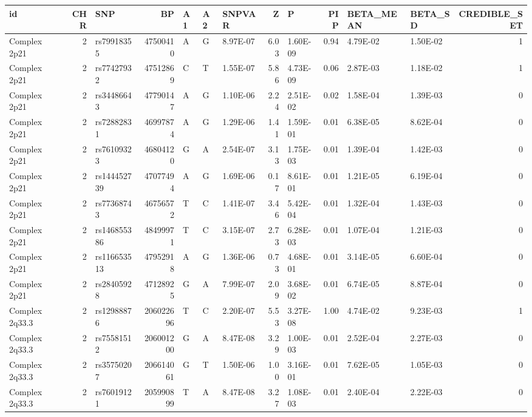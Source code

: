 \begin{table}[ht]
\centering
\begin{tabular}{lrlrlllrlrllr}
  \hline
id & CHR & SNP & BP & A1 & A2 & SNPVAR & Z & P & PIP & BETA\_MEAN & BETA\_SD & CREDIBLE\_SET \\ 
  \hline
Complex 2p21 &   2 & rs79918355 & 47500410 & A & G & 8.97E-07 & 6.03 & 1.60E-09 & 0.94 & 4.79E-02 & 1.50E-02 &   1 \\ 
  Complex 2p21 &   2 & rs77427932 & 47512869 & C & T & 1.55E-07 & 5.86 & 4.73E-09 & 0.06 & 2.87E-03 & 1.18E-02 &   1 \\ 
  Complex 2p21 &   2 & rs34486643 & 47790147 & A & G & 1.10E-06 & 2.24 & 2.51E-02 & 0.02 & 1.58E-04 & 1.39E-03 &   0 \\ 
  Complex 2p21 &   2 & rs72882831 & 46997874 & A & G & 1.29E-06 & 1.41 & 1.59E-01 & 0.01 & 6.38E-05 & 8.62E-04 &   0 \\ 
  Complex 2p21 &   2 & rs76109323 & 46804120 & G & A & 2.54E-07 & 3.13 & 1.75E-03 & 0.01 & 1.39E-04 & 1.42E-03 &   0 \\ 
  Complex 2p21 &   2 & rs144452739 & 47077494 & A & G & 1.69E-06 & 0.17 & 8.61E-01 & 0.01 & 1.21E-05 & 6.19E-04 &   0 \\ 
  Complex 2p21 &   2 & rs77368743 & 46756572 & T & C & 1.41E-07 & 3.46 & 5.42E-04 & 0.01 & 1.32E-04 & 1.43E-03 &   0 \\ 
  Complex 2p21 &   2 & rs146855386 & 48499971 & T & C & 3.15E-07 & 2.73 & 6.28E-03 & 0.01 & 1.07E-04 & 1.21E-03 &   0 \\ 
  Complex 2p21 &   2 & rs116653513 & 47952918 & A & G & 1.36E-06 & 0.73 & 4.68E-01 & 0.01 & 3.14E-05 & 6.60E-04 &   0 \\ 
  Complex 2p21 &   2 & rs28405928 & 47128925 & G & A & 7.99E-07 & 2.09 & 3.68E-02 & 0.01 & 6.74E-05 & 8.87E-04 &   0 \\ 
  Complex 2q33.3 &   2 & rs12988876 & 206022696 & T & C & 2.20E-07 & 5.53 & 3.27E-08 & 1.00 & 4.74E-02 & 9.23E-03 &   1 \\ 
  Complex 2q33.3 &   2 & rs75581512 & 206001200 & G & A & 8.47E-08 & 3.29 & 1.00E-03 & 0.01 & 2.52E-04 & 2.27E-03 &   0 \\ 
  Complex 2q33.3 &   2 & rs35750207 & 206614061 & G & T & 1.50E-06 & 1.00 & 3.16E-01 & 0.01 & 7.62E-05 & 1.05E-03 &   0 \\ 
  Complex 2q33.3 &   2 & rs76019121 & 205990899 & T & A & 8.47E-08 & 3.27 & 1.08E-03 & 0.01 & 2.40E-04 & 2.22E-03 &   0 \\ 

\end{tabular}
\end{table}
